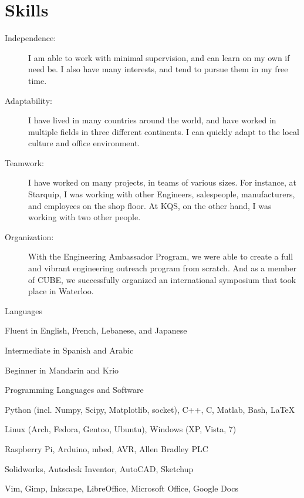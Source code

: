 \documentclass[10pt, a4paper]{article}
\begin{document}
\section{Skills}
\begin{description}
  \item [Independence:] I am able to work with minimal supervision, and can learn on my own if need be.
    I also have many interests, and tend to pursue them in my free time.
  \item [Adaptability:] I have lived in many countries around the world, and have worked in multiple fields in three different continents.
    I can quickly adapt to the local culture and office environment.
  \item [Teamwork:] I have worked on many projects, in teams of various sizes.
    For instance, at Starquip, I was working with other Engineers, salespeople, manufacturers, and employees on the shop floor.
    At KQS, on the other hand, I was working with two other people.
  \item [Organization:] With the Engineering Ambassador Program, we were able to create a full and vibrant engineering outreach program from scratch.
    And as a member of CUBE, we successfully organized an international symposium that took place in Waterloo.
\end{description}

\halfblankline

Languages
\begin{innerlist}
  \item Fluent in English, French, Lebanese, and Japanese
  \item Intermediate in Spanish and Arabic
  \item Beginner in Mandarin and Krio
\end{innerlist}

\halfblankline

Programming Languages and Software
\begin{innerlist}
  \item Python (incl. Numpy, Scipy, Matplotlib, socket), C++, C, Matlab, Bash, \LaTeX
  \item Linux (Arch, Fedora, Gentoo, Ubuntu), Windows (XP, Vista, 7)
  \item Raspberry Pi, Arduino, mbed, AVR, Allen Bradley PLC
  \item Solidworks, Autodesk Inventor, AutoCAD, Sketchup
  \item Vim, Gimp, Inkscape, LibreOffice, Microsoft Office, Google Docs
\end{innerlist}
\end{document}
